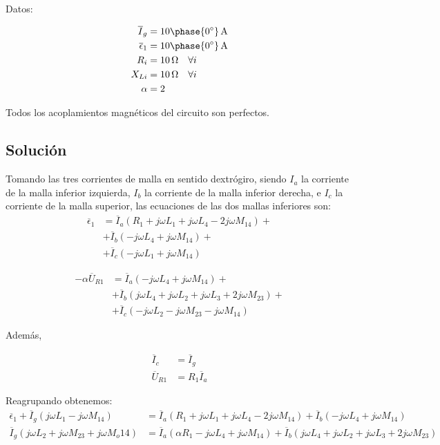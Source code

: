 \documentclass[12pt]{article}
\begin{document}
Datos:

\begin{align*}
  \overline{I}_g &= \SI[parse-numbers=false]{10\phase{\ang{0}}}{\ampere}\\
  \overline{\epsilon}_1 &= \SI[parse-numbers=false]{10\phase{\ang{0}}}{\ampere}\\
  R_i &= \SI{10}{\ohm} \quad \forall i\\
  X_{Li} &= \SI{10}{\ohm} \quad \forall i\\
  \alpha &= 2\\
\end{align*}

Todos los acoplamientos magnéticos del circuito son perfectos.
\subsection*{Solución}
Tomando las tres corrientes de malla en sentido dextrógiro, siendo $I_a$ la corriente de la malla inferior izquierda, $I_b$ la corriente de la malla inferior derecha, e $I_c$ la corriente de la malla superior, las ecuaciones de las dos mallas inferiores son:
\begin{align*}
  \overline{\epsilon}_1 &= \overline{I}_a (R_1 + j \omega L_1 + j \omega L_4 - 2 j \omega M_{14}) + \\
                        &+ \overline{I}_b (-j \omega L_4 + j \omega M_{14}) +\\
                        &+ \overline{I}_c (-j \omega L_1 + j \omega M_{14})
\end{align*}

\begin{align*}
  - \alpha \overline{U}_{R1} &= \overline{I}_a (- j \omega L_4 + j \omega M_{14}) + \\
                        &+ \overline{I}_b (j \omega L_4 + j\omega L_2 + j\omega L_3 + 2j\omega M_{23}) +\\
                        &+ \overline{I}_c (-j \omega L_2 - j \omega M_{23} - j\omega M_{14})
\end{align*}

Además,

\begin{align*}
  \overline{I}_c &= \overline{I}_g\\
  \overline{U}_{R1} &= R_1 \overline{I}_a
\end{align*}

Reagrupando obtenemos:
\begin{align*}
  \overline{\epsilon}_1 + \overline{I}_g (j \omega L_1 - j \omega M_{14}) &= \overline{I}_a (R_1 + j \omega L_1 + j \omega L_4 - 2 j \omega M_{14}) +  \overline{I}_b (-j \omega L_4 + j \omega M_{14})\\
  \overline{I}_g (j \omega L_2 + j \omega M_{23} + j\omega M_o{14}) &= \overline{I}_a (\alpha R_1 - j \omega L_4 + j \omega M_{14}) + \overline{I}_b (j \omega L_4 + j\omega L_2 + j\omega L_3 + 2j\omega M_{23})
\end{align*}
\end{document}
